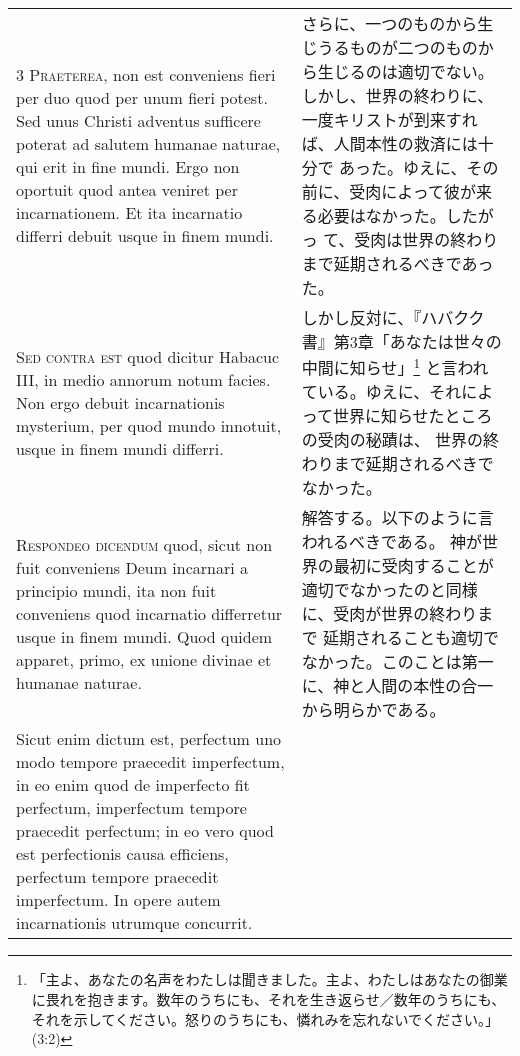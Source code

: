 \documentclass[10pt]{jsarticle} %
\begin{document}
\begin{longtable}{p{21em}p{21em}}
\\


{\scshape 3 Praeterea}, non est conveniens fieri per
duo quod per unum fieri potest. Sed unus Christi adventus sufficere
poterat ad salutem humanae naturae, qui erit in fine mundi. Ergo non
oportuit quod antea veniret per incarnationem. Et ita incarnatio
differri debuit usque in finem mundi.


&

さらに、一つのものから生じうるものが二つのものから生じるのは適切でない。
しかし、世界の終わりに、一度キリストが到来すれば、人間本性の救済には十分で
 あった。ゆえに、その前に、受肉によって彼が来る必要はなかった。したがっ
 て、受肉は世界の終わりまで延期されるべきであった。


\\


{\scshape Sed contra est} quod dicitur Habacuc III, in
medio annorum notum facies. Non ergo debuit incarnationis mysterium, per
quod mundo innotuit, usque in finem mundi differri.


&


しかし反対に、『ハバクク書』第3章「あなたは世々の中間に知らせ」\footnote{「主よ、あなたの名声をわたしは聞きました。主よ、わたしはあなたの御業に畏れを抱きます。数年のうちにも、それを生き返らせ／数年のうちにも、それを示してください。怒りのうちにも、憐れみを忘れないでください。」(3:2)}
と言われている。ゆえに、それによって世界に知らせたところの受肉の秘蹟は、
 世界の終わりまで延期されるべきでなかった。


\\


{\scshape Respondeo dicendum} quod, sicut non fuit
conveniens Deum incarnari a principio mundi, ita non fuit conveniens
quod incarnatio differretur usque in finem mundi. Quod quidem apparet,
primo, ex unione divinae et humanae naturae. 



&

解答する。以下のように言われるべきである。
神が世界の最初に受肉することが適切でなかったのと同様に、受肉が世界の終わりまで
 延期されることも適切でなかった。このことは第一に、神と人間の本性の合一
 から明らかである。


\\


Sicut enim dictum est,
perfectum uno modo tempore praecedit imperfectum, in eo enim quod de
imperfecto fit perfectum, imperfectum tempore praecedit perfectum; in eo
vero quod est perfectionis causa efficiens, perfectum tempore praecedit
imperfectum. In opere autem incarnationis utrumque concurrit. 





\end{longtable}
\end{document}
